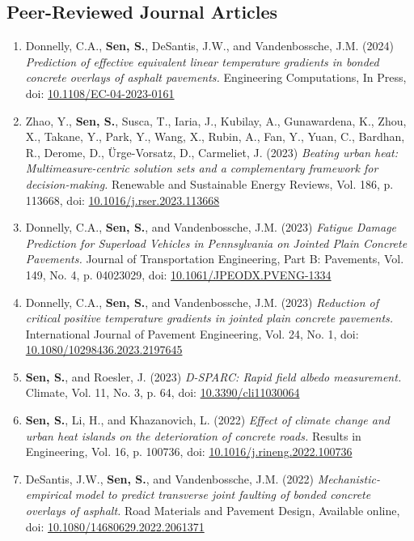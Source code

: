 \documentclass[12pt]{article}
\begin{document}
\subsection*{Peer-Reviewed Journal Articles}
\begin{enumerate}[label=(J\arabic*)]
	\item Donnelly, C.A., \textbf{Sen, S.}, DeSantis, J.W., and Vandenbossche, J.M. (2024) \textit{Prediction of effective equivalent linear temperature gradients in bonded concrete overlays of asphalt pavements.}  Engineering Computations, In Press, doi: \href{https://doi.org/10.1108/EC-04-2023-0161}{10.1108/EC-04-2023-0161}
	\item Zhao, Y., \textbf{Sen, S.}, Susca, T., Iaria, J., Kubilay, A., Gunawardena, K., Zhou, X., Takane, Y., Park, Y., Wang, X., Rubin, A., Fan, Y., Yuan, C., Bardhan, R., Derome, D., Ürge-Vorsatz, D., Carmeliet, J. (2023) \textit{Beating urban heat: Multimeasure-centric solution sets and a complementary framework for decision-making.} Renewable and Sustainable Energy Reviews, Vol. 186, p. 113668, doi: \href{https://doi.org/10.1016/j.rser.2023.113668}{10.1016/j.rser.2023.113668}
	\item Donnelly, C.A., \textbf{Sen, S.}, and Vandenbossche, J.M. (2023) \textit{Fatigue Damage Prediction for Superload Vehicles in Pennsylvania on Jointed Plain Concrete Pavements.}  Journal of Transportation Engineering, Part B: Pavements, Vol. 149, No. 4, p. 04023029, doi: \href{https://doi.org/10.1061/JPEODX.PVENG-1334}{10.1061/JPEODX.PVENG-1334}
	\item Donnelly, C.A., \textbf{Sen, S.}, and Vandenbossche, J.M. (2023) \textit{Reduction of critical positive temperature gradients in jointed plain concrete pavements.}  International Journal of Pavement Engineering, Vol. 24, No. 1, doi: \href{https://doi.org/10.1080/10298436.2023.2197645}{10.1080/10298436.2023.2197645}
	\item \textbf{Sen, S.}, and Roesler, J. (2023) \textit{D-SPARC: Rapid field albedo measurement.}  Climate, Vol. 11, No. 3, p. 64, doi: \href{https://doi.org/10.3390/cli11030064}{10.3390/cli11030064}
	\item \textbf{Sen, S.}, Li, H., and Khazanovich, L. (2022) \textit{Effect of climate change and urban heat islands on the deterioration of concrete roads.} Results in Engineering, Vol. 16, p. 100736, doi: \href{https://doi.org/10.1016/j.rineng.2022.100736}{10.1016/j.rineng.2022.100736}
	\item DeSantis, J.W., \textbf{Sen, S.}, and Vandenbossche, J.M. (2022) \textit{Mechanistic-empirical model to predict transverse joint faulting of bonded concrete overlays of asphalt.} Road Materials and Pavement Design, Available online, doi: \href{https://doi.org/10.1080/14680629.2022.2061371}{10.1080/14680629.2022.2061371}

\end{enumerate}
\end{document}
